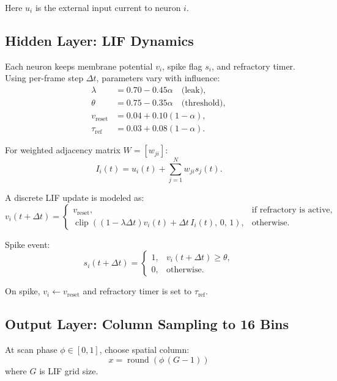 \documentclass[11pt,a4paper]{article}
\begin{document}
Here $u_i$ is the external input current to neuron $i$.

\subsection{Hidden Layer: LIF Dynamics}

Each neuron keeps membrane potential $v_i$, spike flag $s_i$, and refractory timer.
Using per-frame step $\Delta t$, parameters vary with influence:
\begin{align}
\lambda &= 0.70 - 0.45\alpha \quad \text{(leak)}, \\
\theta &= 0.75 - 0.35\alpha \quad \text{(threshold)}, \\
v_{\text{reset}} &= 0.04 + 0.10(1-\alpha), \\
\tau_{\text{ref}} &= 0.03 + 0.08(1-\alpha).
\end{align}

For weighted adjacency matrix $W = [w_{ji}]$:
\begin{equation}
I_i(t) = u_i(t) + \sum_{j=1}^{N} w_{ji}s_j(t).
\end{equation}

A discrete LIF update is modeled as:
\begin{equation}
v_i(t+\Delta t) =
\begin{cases}
v_{\text{reset}}, & \text{if refractory is active},\\
\operatorname{clip}\left((1-\lambda\Delta t)v_i(t) + \Delta t\,I_i(t),\,0,\,1\right), & \text{otherwise}.
\end{cases}
\end{equation}

Spike event:
\begin{equation}
s_i(t+\Delta t)=
\begin{cases}
1, & v_i(t+\Delta t) \ge \theta,\\
0, & \text{otherwise}.
\end{cases}
\end{equation}

On spike, $v_i \leftarrow v_{\text{reset}}$ and refractory timer is set to $\tau_{\text{ref}}$.

\subsection{Output Layer: Column Sampling to 16 Bins}

At scan phase $\phi \in [0,1]$, choose spatial column:
\begin{equation}
x = \operatorname{round}\left(\phi\,(G-1)\right)
\end{equation}
where $G$ is LIF grid size.
\end{document}
